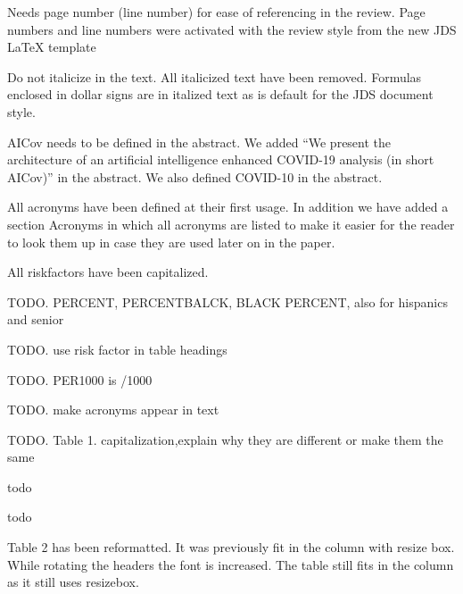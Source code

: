    {Needs page number (line number) for ease of
    referencing in the review.}
  {Page numbers and line numbers were
    activated with the review style from the new JDS \LaTeX{}
    template}

   {Do not italicize in the text.}
  {All italicized text
    have been removed.  Formulas enclosed in dollar signs are in
    italized text as is default for the JDS document style.}


   {AICov needs to be defined in the abstract.}
  {We added ``We present the architecture of an artificial
    intelligence enhanced COVID-19 analysis (in short AICov)''
  in the abstract. We also defined COVID-10 in the abstract.}

  {All acronyms have been defined at their first usage. In addition
    we have added a section Acronyms in which all acronyms are listed
    to make it easier for the reader to look them up in case they are
    used later on in the paper.

    All riskfactors have been capitalized.


TODO. PERCENT, PERCENTBALCK, BLACK PERCENT, also for hispanics and senior

TODO. use risk factor in table headings

TODO. PER1000 is /1000

TODO. make acronyms appear in text

TODO. Table 1. capitalization,explain why they are different or make them the same
  }
  

  { todo}


  { todo}


  { Table 2 has been reformatted. It was previously fit in the column
    with resize box. While rotating the headers the font is
    increased. The table still fits in the column as it still uses
    resizebox.}

